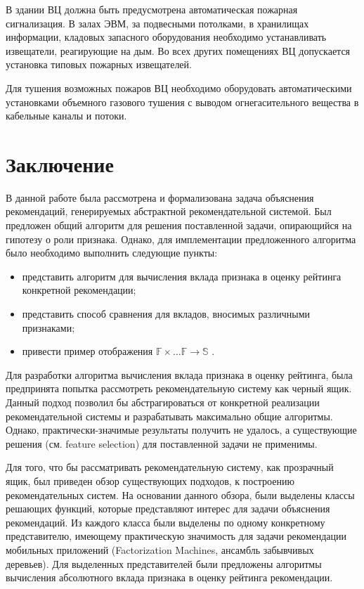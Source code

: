 \documentclass[12pt,a4paper]{report}
\begin{document}
В здании ВЦ должна быть предусмотрена автоматическая пожарная сигнализация. В залах ЭВМ, за подвесными потолками, в хранилищах информации, кладовых запасного оборудования необходимо устанавливать извещатели, реагирующие на дым. Во всех других помещениях ВЦ допускается установка типовых пожарных извещателей.

Для тушения возможных пожаров ВЦ необходимо оборудовать автоматическими установками объемного газового тушения с выводом огнегасительного вещества в кабельные каналы и потоки.

\chapter{Заключение}
В данной работе была рассмотрена и формализована задача объяснения рекомендаций, генерируемых абстрактной рекомендательной системой. Был предложен общий алгоритм для решения поставленной задачи, опирающийся на гипотезу о роли признака. Однако, для имплементации предложенного алгоритма было необходимо выполнить следующие пункты:
\begin{itemize}
\item представить алгоритм для вычисления вклада признака в оценку рейтинга конкретной рекомендации;
\item представить способ сравнения для вкладов, вносимых различными признаками;
\item привести пример отображения $\mathbb{F} \times \dots \mathbb{F} \to \mathbb{S}$ .
\end{itemize}

Для разработки алгоритма вычисления вклада признака в оценку рейтинга, была предпринята попытка рассмотреть рекомендательную систему как черный ящик. Данный подход позволил бы абстрагироваться от конкретной реализации рекомендательной системы и разрабатывать максимально общие алгоритмы. Однако, практически-значимые результаты получить не удалось, а существующие решения (см. feature selection) для поставленной задачи не применимы.

Для того, что бы рассматривать рекомендательную систему, как прозрачный ящик, был приведен обзор существующих подходов, к построению рекомендательных систем. На основании данного обзора, были выделены классы решающих функций, которые представляют интерес для задачи объяснения рекомендаций. Из каждого класса были выделены по одному конкретному представителю, имеющему практическую значимость для задачи рекомендации мобильных приложений (Factorization Machines, ансамбль забывчивых деревьев). Для выделенных представителей были предложены алгоритмы вычисления абсолютного вклада признака в оценку рейтинга рекомендации.
\end{document}
